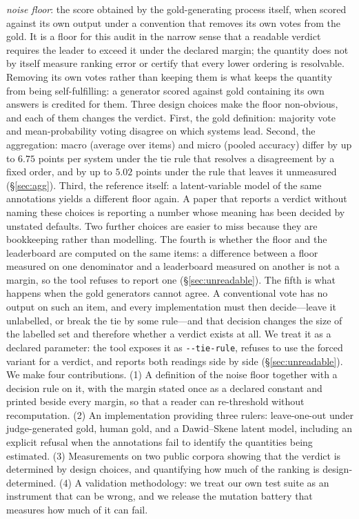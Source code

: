\documentclass{article}
\begin{document}
\emph{noise floor}: the score obtained by the gold-generating process itself, when scored against its own output under a convention that removes its own votes from the gold. It is a floor for this audit in the narrow sense that a readable verdict requires the leader to exceed it under the declared margin; the quantity does not by itself measure ranking error or certify that every lower ordering is resolvable. Removing its own votes rather than keeping them is what keeps the quantity from being self-fulfilling: a generator scored against gold containing its own answers is credited for them. Three design choices make the floor non-obvious, and each of them changes the verdict. First, the gold definition: majority vote and mean-probability voting disagree on which systems lead. Second, the aggregation: macro (average over items) and micro (pooled accuracy) differ by up to $6.75$ points per system under the tie rule that resolves a disagreement by a fixed order, and by up to $5.02$ points under the rule that leaves it unmeasured (\S\ref{sec:agg}). Third, the reference itself: a latent-variable model of the same annotations yields a different floor again. A paper that reports a verdict without naming these choices is reporting a number whose meaning has been decided by unstated defaults. Two further choices are easier to miss because they are bookkeeping rather than modelling. The fourth is whether the floor and the leaderboard are computed on the same items: a difference between a floor measured on one denominator and a leaderboard measured on another is not a margin, so the tool refuses to report one (\S\ref{sec:unreadable}). The fifth is what happens when the gold generators cannot agree. A conventional vote has no output on such an item, and every implementation must then decide---leave it unlabelled, or break the tie by some rule---and that decision changes the size of the labelled set and therefore whether a verdict exists at all. We treat it as a declared parameter: the tool exposes it as \texttt{-{}-tie-rule}, refuses to use the forced variant for a verdict, and reports both readings side by side (\S\ref{sec:unreadable}). We make four contributions. (1) A definition of the noise floor together with a decision rule on it, with the margin stated once as a declared constant and printed beside every margin, so that a reader can re-threshold without recomputation. (2) An implementation providing three rulers: leave-one-out under judge-generated gold, human gold, and a Dawid--Skene latent model, including an explicit refusal when the annotations fail to identify the quantities being estimated. (3) Measurements on two public corpora showing that the verdict is determined by design choices, and quantifying how much of the ranking is design-determined. (4) A validation methodology: we treat our own test suite as an instrument that can be wrong, and we release the mutation battery that measures how much of it can fail.
\end{document}
